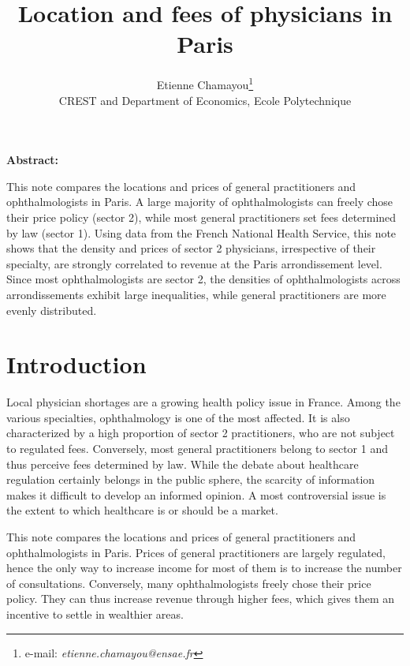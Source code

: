 \documentclass[11pt]{article}
\begin{document}
\title{Location and fees of physicians in Paris}
\author{Etienne Chamayou\thanks{e-mail:
\textit{etienne.chamayou@ensae.fr}}\medskip\\{\normalsize CREST and Department of Economics, Ecole Polytechnique }}
\maketitle

\sloppy%

\onehalfspacing

\textbf{Abstract:}

This note compares the locations and prices of general practitioners and ophthalmologists in Paris. A large majority of ophthalmologists can freely chose their price policy (sector 2), while most general practitioners set fees determined by law (sector 1). Using data from the French National Health Service, this note shows that the density and prices of sector 2 physicians, irrespective of their specialty, are strongly correlated to revenue at the Paris arrondissement level. Since most ophthalmologists are sector 2, the densities of ophthalmologists across arrondissements exhibit large inequalities, while general practitioners are more evenly distributed.

\strut

\pagebreak%
\doublespacing

\section{Introduction}

Local physician shortages are a growing health policy issue in France. Among the various specialties, ophthalmology is one of the most affected. It is also characterized by a high proportion of sector 2 practitioners, who are not subject to regulated fees. Conversely, most general practitioners belong to sector 1 and thus perceive fees determined by law. While the debate about healthcare regulation certainly belongs in the public sphere, the scarcity of information makes it difficult to develop an informed opinion. A most controversial issue is the extent to which healthcare is or should be a market.

This note compares the locations and prices of general practitioners and ophthalmologists in Paris. Prices of general practitioners are largely regulated, hence the only way to increase income for most of them is to increase the number of consultations. Conversely, many ophthalmologists freely chose their price policy. They can thus increase revenue through higher fees, which gives them an incentive to settle in wealthier areas.
\end{document}

